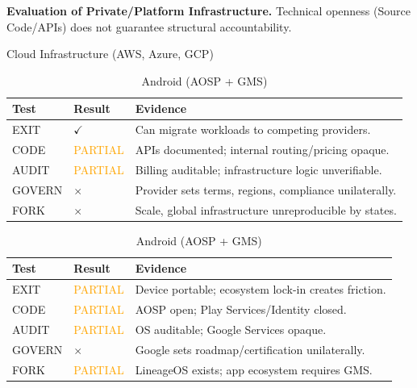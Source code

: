 \documentclass{article}
\begin{document}
\begin{table}[htbp]
    \centering
    \scriptsize
    \caption{\textbf{Evaluation of Private/Platform Infrastructure.} Technical openness (Source Code/APIs) does not guarantee structural accountability.}
    \label{tab:corp_infra}

    \begin{subtable}{1\textwidth}
        \centering
        \caption{Cloud Infrastructure (AWS, Azure, GCP)}
        \begin{tabular}{@{}llp{7cm}@{}}
            \toprule
            \textbf{Test} & \textbf{Result} & \textbf{Evidence} \\
            \midrule
            EXIT & $\checkmark$ & Can migrate workloads to competing providers. \\
            CODE & \textcolor{orange}{PARTIAL} & APIs documented; internal routing/pricing opaque. \\
            AUDIT & \textcolor{orange}{PARTIAL} & Billing auditable; infrastructure logic unverifiable. \\
            GOVERN & $\times$ & Provider sets terms, regions, compliance unilaterally. \\
            FORK & $\times$ & Scale, global infrastructure unreproducible by states. \\
            \bottomrule
        \end{tabular}
    \end{subtable}

    \begin{subtable}{1\textwidth}
        \centering
        \caption{Android (AOSP + GMS)}
        \begin{tabular}{@{}llp{7cm}@{}}
            \toprule
            \textbf{Test} & \textbf{Result} & \textbf{Evidence} \\
            \midrule
            EXIT & \textcolor{orange}{PARTIAL} & Device portable; ecosystem lock-in creates friction. \\
            CODE & \textcolor{orange}{PARTIAL} & AOSP open; Play Services/Identity closed. \\
            AUDIT & \textcolor{orange}{PARTIAL} & OS auditable; Google Services opaque. \\
            GOVERN & $\times$ & Google sets roadmap/certification unilaterally. \\
            FORK & \textcolor{orange}{PARTIAL} & LineageOS exists; app ecosystem requires GMS. \\
            \bottomrule
        \end{tabular}
    \end{subtable}


\end{table}
\end{document}
